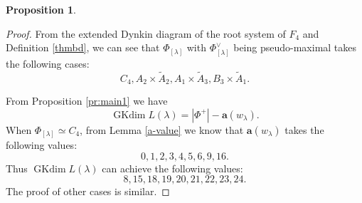 \documentclass[reqno,12pt]{amsart}
\numberwithin{equation}{section}
\theoremstyle{plain}
\newtheorem{Prop}[Thm]{Proposition}
\theoremstyle{definition}
\newcommand{\lam}{\lambda}
\newcommand{\Ann}{\mathrm{Ann}}
\newcommand{\aff}{ \mathbf{a} }
\newcommand{\gkd}{\operatorname{GKdim}}
\newcommand{\lest}{\leqslant}
\begin{document}
\begin{Prop}
\begin{itemize}

    

		
\end{itemize}
\end{Prop}

\begin{proof}


From the extended Dynkin diagram of the root system of $F_4$ and Definition \ref{thmbd}, we can see that $\Phi_{[\lam]}$ with $\Phi_{[\lam]}^\vee$ being pseudo-maximal takes the following cases:
$$C_4, A_2\times \tilde{A}_2, A_1\times \tilde{A}_3, B_3\times \tilde{A}_1.$$


 From Proposition \ref{pr:main1} we have \begin{equation*}
	\gkd L(\lambda)=|\Phi^+|-\aff(w_{\lambda}).
\end{equation*}
When $\Phi_{[\lam]}\simeq C_4$,
  from Lemma \ref{a-value} we know that $\aff(w_{\lambda})$ takes the following values: $$0,1,2,3,4,5,6,9,16.$$ 
 Thus $ \gkd L(\lam) $ can achieve the following values:
$$8,15,18,19,20,21,22,23,24.$$
The proof of other cases is similar.




\end{proof}
\end{document}
